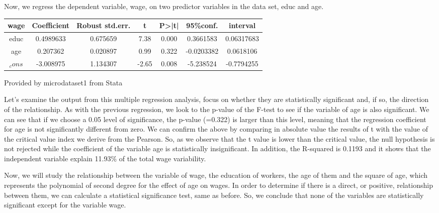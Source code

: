 \documentclass[10pt,towside,a4paper]{article}
\begin{document}
	Now, we regress the dependent variable, wage, on two predictor variables in the data set, educ and age.
	\vspace {0.5\baselineskip}
	
\begin{table}[H]
	\begin{Center}
		 \label{tab:title} 
		\begin{tabular}{|c |c |c |c |c |c c|}
			\toprule
			wage &Coefficient & Robust std.err. & t & P>|t| & 95\%conf. & interval \\ 
			\midrule
			educ & 0.4989633 	& 0.675659 & 7.38  & 0.000 & 0.3661583  & 0.06317683\\
			age & 0.207362 		& 0.020897 & 0.99  & 0.322 & -0.0203382 & 0.0618106 \\
			$_cons$ & -3.008975 & 1.134307 & -2.65 & 0.008 & -5.238524  & -0.7794255\\
			
			\bottomrule
			
		\end{tabular} \par
		
		Provided by microdataset1 from Stata
	\end{Center}
	\vspace {0.5\baselineskip}
	
	Let’s examine the output from this multiple regression analysis, focus on whether they are statistically significant and, if so, the direction of the relationship. As with the previous regression, we look to the p-value of the F-test to see if the variable of age is also significant. We can see that if we choose a 0.05 level of significance, the p-value (=0.322) is larger than this level, meaning that the regression coefficient for age is not significantly different from zero. We can confirm the above by comparing in absolute value the results of t with the value of the critical value index we derive from the Pearson. So, as we observe that the t value is lower than the critical value, the null hypothesis is not rejected while the coefficient of the variable age is statistically insignificant. In addition, the R-squared is 0.1193 and it shows that the independent variable explain 11.93\% of the total wage variability.
	\vspace {0.5\baselineskip}
	
	Now, we will study the relationship between the variable of wage, the education of workers, the age of them and the square of age, which represents the polynomial of second degree for the effect of age on wages. In order to determine if there is a direct, or positive, relationship between them, we can calculate a statistical significance test, same as before. So, we conclude that none of the variables are statistically significant except for the variable wage.
\end{table}
\end{document}
